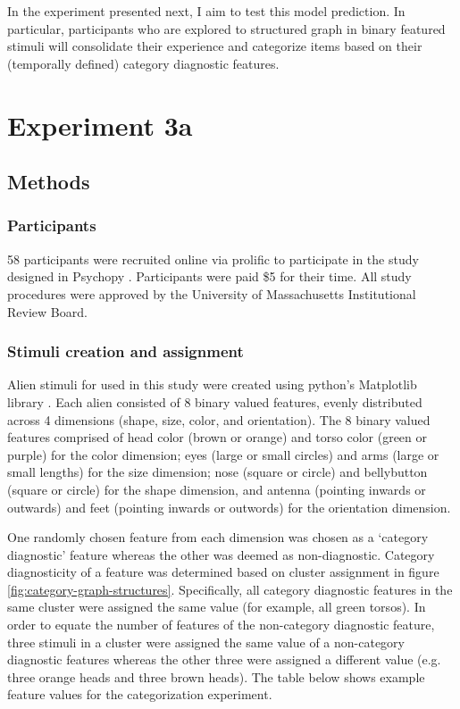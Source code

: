 In the experiment presented next, I aim to test this model prediction. In particular, participants who are explored to structured graph in binary featured stimuli will consolidate their experience and categorize items based on their (temporally defined) category diagnostic features. 

\section{Experiment 3a}
\subsection{Methods}

\subsubsection*{Participants}
58 participants were recruited online via prolific to participate in the study designed in Psychopy \cite{peirce2007psychopy}. Participants were paid \$5 for their time. All study procedures were approved by the University of Massachusetts Institutional Review Board. 

\subsubsection*{Stimuli creation and assignment}
Alien stimuli for used in this study were created using python's Matplotlib library \cite{hunter2007matplotlib}. Each alien consisted of 8 binary valued features, evenly distributed across 4 dimensions (shape, size, color, and orientation). The 8 binary valued features comprised of head color (brown or orange) and torso color (green or purple) for the color dimension; eyes (large or small circles) and arms (large or small lengths) for the size dimension; nose (square or circle) and bellybutton (square or circle) for the shape dimension, and antenna (pointing inwards or outwards) and feet (pointing inwards or outwords) for the orientation dimension. 

One randomly chosen feature from each dimension was chosen as a `category diagnostic' feature whereas the other was deemed as non-diagnostic. Category diagnosticity of a feature was determined based on cluster assignment in figure \ref{fig:category-graph-structures}. Specifically, all category diagnostic features in the same cluster were assigned the same value (for example, all green torsos). In order to equate the number of features of the non-category diagnostic feature, three stimuli in a cluster were assigned the same value of a non-category diagnostic features whereas the other three were assigned a different value (e.g. three orange heads and three brown heads). The table below shows example feature values for the categorization experiment. 

